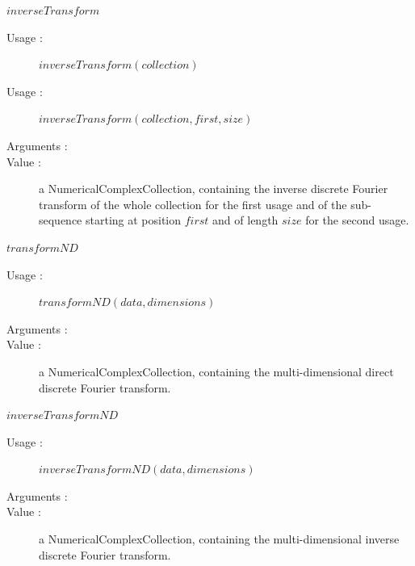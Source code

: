 \begin{description}
\begin{description}
  \item $inverseTransform$
    \begin{description}
    \item[Usage :]  $inverseTransform(collection)$
    \item[Usage :]  $inverseTransform(collection, first, size)$
    \item[Arguments :]  \strut
    \item[Value :] a NumericalComplexCollection, containing the inverse discrete Fourier transform of the whole collection for the first usage and of the sub-sequence starting at position $first$ and of length $size$ for the second usage.
    \end{description}

  \item $transformND$
    \begin{description}
    \item[Usage :]  $transformND(data, dimensions)$
    \item[Arguments :]  \strut
    \item[Value :] a NumericalComplexCollection, containing the multi-dimensional direct discrete Fourier transform.
    \end{description}

  \item $inverseTransformND$
    \begin{description}
    \item[Usage :]  $inverseTransformND(data, dimensions)$
    \item[Arguments :]  \strut
    \item[Value :] a NumericalComplexCollection, containing the multi-dimensional inverse discrete Fourier transform.
    \end{description}


\end{description}
\end{description}
